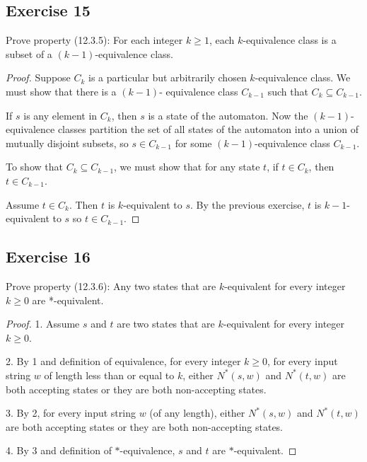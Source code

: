 \documentclass[14pt]{extarticle}
\begin{document}
\subsection{Exercise 15}
Prove property (12.3.5): For each integer \(k \geq 1\), each \(k\)-equivalence class is a subset of a
\((k - 1)\)-equivalence class.

\begin{proof}
    Suppose \(C_k\) is a particular but arbitrarily chosen \(k\)-equivalence class. We must show that there is a \((k - 1)\)-
    equivalence class \(C_{k-1}\) such that \(C_k \subseteq C_{k-1}\).

    If \(s\) is any element in \(C_k\), then \(s\) is a state of the automaton. Now the \((k - 1)\)-equivalence classes
    partition the set of all states of the automaton into a union of mutually disjoint subsets, so \(s \in C_{k-1}\) for some
    \((k - 1)\)-equivalence class \(C_{k-1}\).

    To show that \(C_k \subseteq C_{k-1}\), we must show that for any state \(t\), if \(t \in C_k\), then \(t \in C_{k-1}\).

    Assume \(t \in C_k\). Then \(t\) is \(k\)-equivalent to \(s\). By the previous exercise, \(t\) is \(k-1\)-equivalent to \(s\)
    so \(t \in C_{k-1}\).
\end{proof}

\subsection{Exercise 16}
Prove property (12.3.6): Any two states that are \(k\)-equivalent for every integer \(k \geq 0\) are *-equivalent.

\begin{proof}
    1. Assume \(s\) and \(t\) are two states that are \(k\)-equivalent for every integer \(k \geq 0\).

    2. By 1 and definition of equivalence, for every integer \(k \geq 0\), for every input string \(w\) of length less than or
    equal to \(k\), either \(N^*(s, w)\) and \(N^*(t, w)\) are
    both accepting states or they are both non-accepting states.

    3. By 2, for every input string \(w\) (of any length), either \(N^*(s, w)\) and \(N^*(t, w)\) are both accepting states or
    they are both non-accepting states.

    4. By 3 and definition of \(*\)-equivalence, \(s\) and \(t\) are \(*\)-equivalent.
\end{proof}
\end{document}
